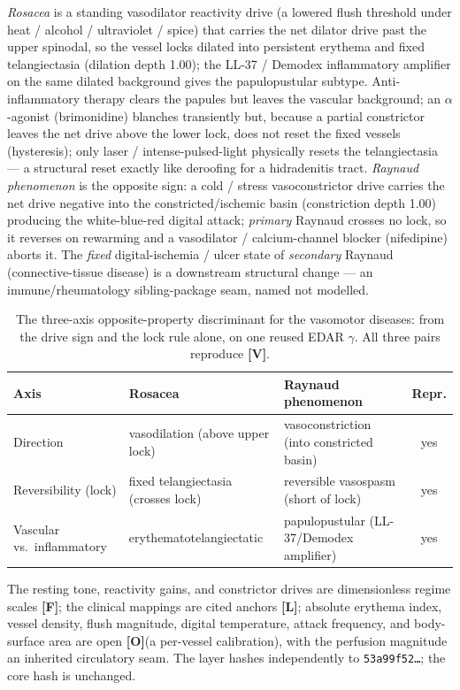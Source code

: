 \documentclass[11pt,a4paper]{article}
\newcommand{\V}{\textcolor{gV}{\textbf{[V]}}}
\newcommand{\Lg}{\textcolor{gL}{\textbf{[L]}}}
\newcommand{\Fg}{\textcolor{gF}{\textbf{[F]}}}
\newcommand{\Og}{\textcolor{gO}{\textbf{[O]}}}
\begin{document}
\emph{Rosacea} is a standing vasodilator reactivity drive (a lowered flush threshold under heat / alcohol /
ultraviolet / spice) that carries the net dilator drive past the upper spinodal, so the vessel locks dilated into
persistent erythema and fixed telangiectasia (dilation depth 1.00); the LL-37 / Demodex inflammatory amplifier on
the same dilated background gives the papulopustular subtype. Anti-inflammatory therapy clears the papules but
leaves the vascular background; an $\alpha$-agonist (brimonidine) blanches transiently but, because a partial
constrictor leaves the net drive above the lower lock, does not reset the fixed vessels (hysteresis); only laser /
intense-pulsed-light physically resets the telangiectasia --- a structural reset exactly like deroofing for a
hidradenitis tract. \emph{Raynaud phenomenon} is the opposite sign: a cold / stress vasoconstrictor drive carries
the net drive negative into the constricted/ischemic basin (constriction depth 1.00) producing the white-blue-red
digital attack; \emph{primary} Raynaud crosses no lock, so it reverses on rewarming and a vasodilator /
calcium-channel blocker (nifedipine) aborts it. The \emph{fixed} digital-ischemia / ulcer state of \emph{secondary}
Raynaud (connective-tissue disease) is a downstream structural change --- an immune/rheumatology sibling-package
seam, named not modelled.

\begin{table}[h]
\centering\footnotesize
\caption{The three-axis opposite-property discriminant for the vasomotor diseases: from the drive sign and the lock
rule alone, on one reused EDAR $\gamma$. All three pairs reproduce \V.}
\begin{tabular}{@{}p{2.9cm} p{4.5cm} p{4.9cm} c@{}}
\toprule
\textbf{Axis} & \textbf{Rosacea} & \textbf{Raynaud phenomenon} & \textbf{Repr.}\\
\midrule
Direction              & vasodilation (above upper lock)   & vasoconstriction (into constricted basin) & yes\\
Reversibility (lock)   & fixed telangiectasia (crosses lock)& reversible vasospasm (short of lock)      & yes\\
Vascular vs.\ inflammatory & erythematotelangiectatic       & papulopustular (LL-37/Demodex amplifier)  & yes\\
\bottomrule
\end{tabular}
\end{table}

The resting tone, reactivity gains, and constrictor drives are dimensionless regime scales \Fg; the clinical
mappings are cited anchors \Lg; absolute erythema index, vessel density, flush magnitude, digital temperature,
attack frequency, and body-surface area are open \Og (a per-vessel calibration), with the perfusion magnitude an
inherited circulatory seam. The layer hashes independently to \texttt{53a99f52\dots}; the core hash is unchanged.
\end{document}
